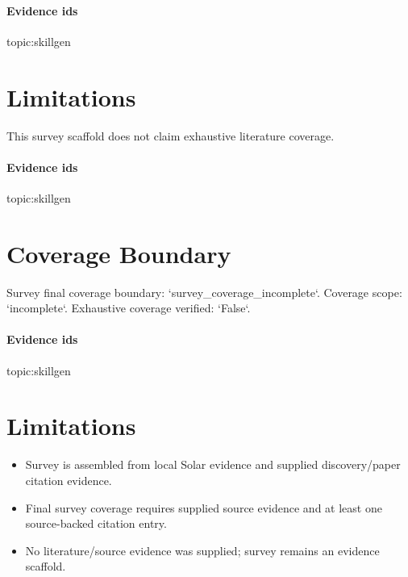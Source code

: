 \documentclass{article}
\begin{document}
\paragraph{Evidence ids} topic:skillgen

\section{Limitations}
This survey scaffold does not claim exhaustive literature coverage.

\paragraph{Evidence ids} topic:skillgen

\section{Coverage Boundary}
Survey final coverage boundary: `survey\_coverage\_incomplete`. Coverage scope: `incomplete`. Exhaustive coverage verified: `False`.

\paragraph{Evidence ids} topic:skillgen

\section{Limitations}

\begin{itemize}\item Survey is assembled from local Solar evidence and supplied discovery/paper citation evidence.\end{itemize}
\begin{itemize}\item Final survey coverage requires supplied source evidence and at least one source-backed citation entry.\end{itemize}
\begin{itemize}\item No literature/source evidence was supplied; survey remains an evidence scaffold.\end{itemize}
\end{document}
